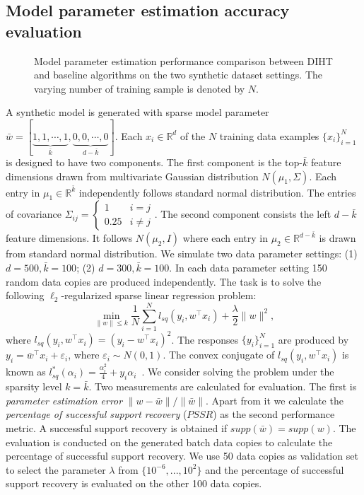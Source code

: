 \documentclass[11pt]{article}
\numberwithin{equation}{section}
\numberwithin{table}{section}
\numberwithin{figure}{section}
\begin{document}
\subsection{Model parameter estimation accuracy evaluation}
\label{sect:experiment}
\begin{figure}
\centering
{}
\caption{Model parameter estimation performance comparison between DIHT and baseline algorithms on the two synthetic dataset settings. The varying number of training sample is denoted by $N$.}
\label{fig:supportrecovery}
\end{figure}
A synthetic model is generated with sparse model parameter $\bar{w}=[\underbrace{1,1,\cdots,1}_{\bar{k}},\underbrace{0,0,\cdots,0}_{d-\bar{k}}]$. Each $x_i\in \mathbb{R}^{d}$ of the $N$ training data examples $\{x_i\}_{i=1}^N$ is designed to have two components. The first component is the top-$\bar{k}$ feature dimensions drawn from multivariate Gaussian distribution $N(\mu_1,\Sigma)$. Each entry in $\mu_1\in \mathbb{R}^{\bar{k}}$ independently follows standard normal distribution. The entries of covariance $\Sigma_{ij}=\left\{\begin{array}{ll} 1 & i=j\\
0.25 & i\ne j
\end{array}\right..$
The second component consists the left $d-\bar{k}$ feature dimensions. It follows $N(\mu_2, I)$ where each entry in $\mu_2\in \mathbb{R}^{d-\bar{k}}$ is drawn from standard normal distribution. We simulate two data parameter settings: (1) $d=500,\bar{k}=100$; (2) $d=300, \bar{k}=100$. In each data parameter setting 150 random data copies are produced independently. The task is to solve the following $\ell_2$-regularized sparse linear regression problem:
\vspace{-5.5mm}
\[
\min_{\|w\|\le k} \frac{1}{N}\sum\limits_{i=1}^Nl_{sq}(y_i,w^{\top}x_i)+\frac{\lambda}{2}\|w\|^2,
\]
where $l_{sq}(y_i,w^{\top}x_i)=(y_i-w^{\top}x_i)^2$. The responses $\{y_i\}_{i=1}^N$ are produced by $y_i=\bar{w}^{\top}x_i+\varepsilon_i$, where $\varepsilon_i\sim N(0,1)$. The convex conjugate of $l_{sq}(y_i,w^{\top}x_i)$ is known as $l_{sq}^*(\alpha_i)=\frac{\alpha_i^2}{4}+y_i\alpha_i$~\cite{shalev2013stochastic}. We consider solving the problem under the sparsity level $k=\bar{k}$. Two measurements are calculated for evaluation. The first is \emph{parameter estimation error} $\|w-\bar{w}\|/\|\bar{w}\|$. Apart from it we calculate the \emph{percentage of successful support recovery} ($PSSR$) as the second performance metric. A successful support recovery is obtained if $supp(\bar{w})= supp(w)$. The evaluation is conducted on the generated batch data copies to calculate the percentage of successful support recovery. We use 50 data copies as validation set to select the parameter $\lambda$ from $\{10^{-6},...,10^2\}$ and the percentage of successful support recovery is evaluated on the other 100 data copies.
\end{document}
